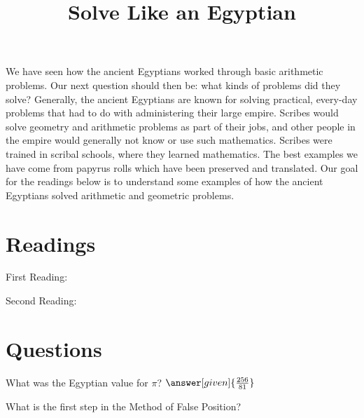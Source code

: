 \documentclass{ximera}
\title{Solve Like an Egyptian}
\begin{document}
\begin{abstract}
\end{abstract}
\maketitle



We have seen how the ancient Egyptians worked through basic arithmetic problems.  Our next question should then be: what kinds of problems did they solve?  Generally, the ancient Egyptians are known for solving practical, every-day problems that had to do with administering their large empire.  Scribes would solve geometry and arithmetic problems as part of their jobs, and other people in the empire would generally not know or use such mathematics.  Scribes were trained in scribal schools, where they learned mathematics.  The best examples we have come from papyrus rolls which have been preserved and translated.  Our goal for the readings below is to understand some examples of how the ancient Egyptians solved arithmetic and geometric problems.



\section{Readings}

First Reading: 

Second Reading: 




\section{Questions}

\begin{question}
What was the Egyptian value for $\pi$? $\answer[given]{\frac{256}{81}}$
\end{question}

\begin{question}
What is the first step in the Method of False Position?
\begin{multipleChoice}
\end{multipleChoice}
\end{question}


\end{document}
